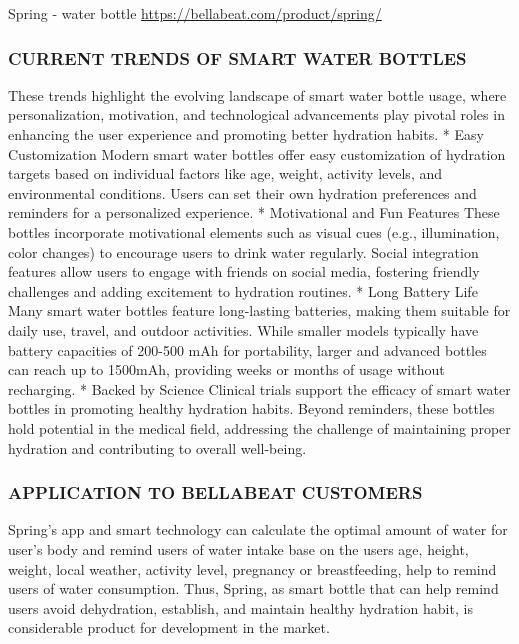 \documentclass[
]{article}
\begin{document}
Spring - water bottle \href{URL}{https://bellabeat.com/product/spring/}

\hypertarget{current-trends-of-smart-water-bottles}{%
\subsubsection{CURRENT TRENDS OF SMART WATER
BOTTLES}\label{current-trends-of-smart-water-bottles}}

These trends highlight the evolving landscape of smart water bottle
usage, where personalization, motivation, and technological advancements
play pivotal roles in enhancing the user experience and promoting better
hydration habits. * Easy Customization Modern smart water bottles offer
easy customization of hydration targets based on individual factors like
age, weight, activity levels, and environmental conditions. Users can
set their own hydration preferences and reminders for a personalized
experience. * Motivational and Fun Features These bottles incorporate
motivational elements such as visual cues (e.g., illumination, color
changes) to encourage users to drink water regularly. Social integration
features allow users to engage with friends on social media, fostering
friendly challenges and adding excitement to hydration routines. * Long
Battery Life Many smart water bottles feature long-lasting batteries,
making them suitable for daily use, travel, and outdoor activities.
While smaller models typically have battery capacities of 200-500 mAh
for portability, larger and advanced bottles can reach up to 1500mAh,
providing weeks or months of usage without recharging. * Backed by
Science Clinical trials support the efficacy of smart water bottles in
promoting healthy hydration habits. Beyond reminders, these bottles hold
potential in the medical field, addressing the challenge of maintaining
proper hydration and contributing to overall well-being.

\hypertarget{application-to-bellabeat-customers}{%
\subsubsection{APPLICATION TO BELLABEAT
CUSTOMERS}\label{application-to-bellabeat-customers}}

Spring's app and smart technology can calculate the optimal amount of
water for user's body and remind users of water intake base on the users
age, height, weight, local weather, activity level, pregnancy or
breastfeeding, help to remind users of water consumption. Thus, Spring,
as smart bottle that can help remind users avoid dehydration, establish,
and maintain healthy hydration habit, is considerable product for
development in the market.
\end{document}
